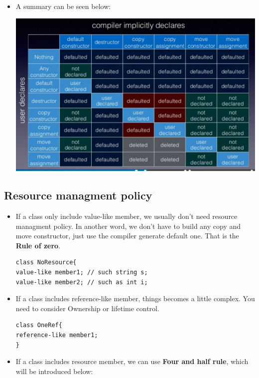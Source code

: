 \documentclass[a4paper,11pt,twoside]{book}
\begin{document}
\begin{itemize}
\item A summary can be seen below: \\
\begin{center}
	\includegraphics[scale=0.8]{pics/sm3.png} \newline
\end{center}

\end{itemize}

\subsection{Resource managment policy}
\begin{itemize}
    \item If a class only include value-like member, we usually don't need resource managment policy. In another word, 
we don't have to build any copy and move constructor, just use the compiler generate default one. That is the \textbf{Rule of zero}.
\begin{lstlisting}
class NoResource{
value-like member1; // such string s;
value-like member2; // such as int i;
\end{lstlisting}

    \item If a class includes reference-like member, things becomes a little complex. You need to consider Ownership or lifetime control. 

\begin{lstlisting}
class OneRef{
reference-like member1;
}
\end{lstlisting}

    \item If a class includes resource member, we can use \textbf{Four and half rule}, which will be introduced below:
\end{itemize}
\end{document}
